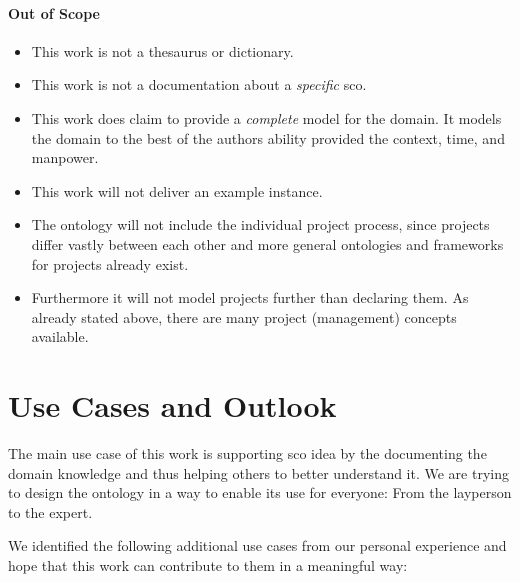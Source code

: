 \documentclass[a4paper, DIV=13, BCOR=0cm]{scrbook}
\begin{document}
\paragraph{Out of Scope}
\begin{itemize}
	\item This work is not a thesaurus or dictionary.
	\item This work is not a documentation about a \textit{specific} \gls{sco}.
	\item This work does claim to provide a \textit{complete} model for the domain. It models the domain to the best of the authors ability provided the context, time, and manpower.
	\item This work will not deliver an example instance.
	\item The ontology will not include the individual project process, since projects differ vastly between each other and more general ontologies and frameworks for projects already exist.
	\item Furthermore it will not model projects further than declaring them. As already stated above, there are many project (management) concepts available.
\end{itemize}

\section{Use Cases and Outlook}
The main use case of this work is supporting \gls{sco} idea by the documenting the domain knowledge and thus helping others to better understand it. We are trying to design the ontology in a way to enable its use for everyone: From the layperson to the expert.

We identified the following additional use cases from our personal experience and hope that this work can contribute to them in a meaningful way:
\end{document}
